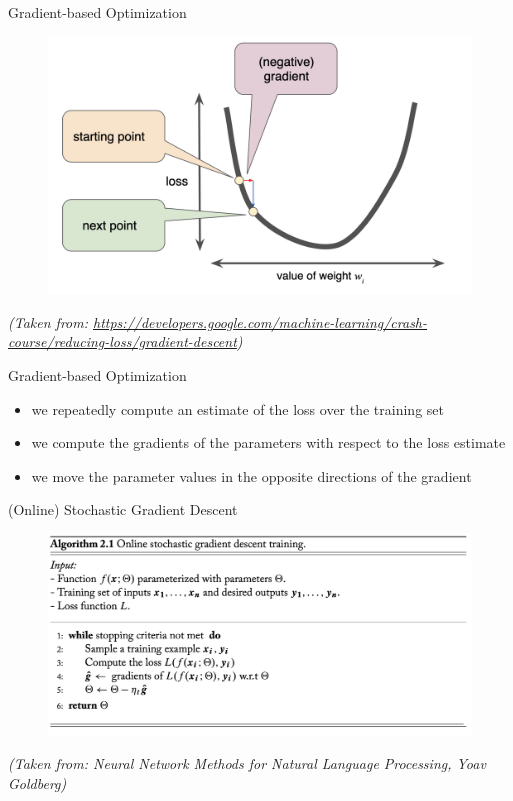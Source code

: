 \begin{frame}{Gradient-based Optimization}
{\begin{figure}
    \end{figure}      
    }
    {
     \begin{figure}
        \centering
        \includegraphics[scale=0.2]{./figures/sgd4.png}
    \end{figure}
    }
\vspace*{\fill}
\textit{\tiny{(Taken from: 
\url{https://developers.google.com/machine-learning/crash-course/reducing-loss/gradient-descent})}}
   
\end{frame}
\begin{frame}{Gradient-based Optimization}
    \begin{itemize}
        \item<1-> we repeatedly compute an estimate of the loss over the training set
        \item<2-> we compute the gradients of the parameters with respect to the loss estimate
        \item<3-> we move the parameter values in the opposite directions of the gradient
    \end{itemize}
\end{frame}
\begin{frame}{(Online) Stochastic Gradient Descent}
\centering
\begin{figure}
    \includegraphics[scale=0.25]{./figures/sgd.png}
\end{figure}
\vspace*{\fill}
\textit{\tiny{(Taken from: Neural Network Methods for Natural Language Processing, Yoav Goldberg)}}
\end{frame}
